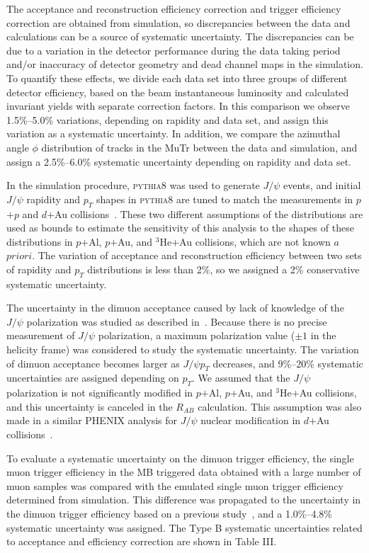 \documentclass[twocolumn,letterpaper,aps,prc,longbibliography,superscriptaddress,nofootinbib,floatfix]{revtex4-1}
\newcommand{\pt}{\mbox{$p_T$}\xspace}
\newcommand{\rab}{\mbox{$R_{AB}$}\xspace}
\newcommand{\pp}{\mbox{$p$$+$$p$}\xspace}
\newcommand{\dau}{\mbox{$d$$+$Au}\xspace}
\newcommand{\pau}{\mbox{$p$$+$Au}\xspace}
\newcommand{\pal}{\mbox{$p$$+$Al}\xspace}
\newcommand{\heau}{\mbox{$^{3}$He$+$Au}\xspace}
\newcommand{\jpsi}{\mbox{$J/\psi$}\xspace}
\newcommand{\pythia}{\mbox{\textsc{pythia8}}\xspace}
\begin{document}
The acceptance and reconstruction efficiency correction and trigger 
efficiency correction are obtained from simulation, so discrepancies 
between the data and calculations can be a source of systematic uncertainty. The 
discrepancies can be due to a variation in the detector performance 
during the data taking period and/or inaccuracy of detector geometry and 
dead channel maps in the simulation. To quantify these effects, 
we divide each data set into three groups of different detector 
efficiency, based on the beam instantaneous luminosity and calculated 
invariant yields with separate correction factors. In this comparison we 
observe 1.5\%--5.0\% variations, depending on rapidity and data set, and 
assign this variation as a systematic uncertainty. In addition, we 
compare the azimuthal angle $\phi$ distribution of tracks in the MuTr 
between the data and simulation, and assign a 2.5\%--6.0\% systematic 
uncertainty depending on rapidity and data set.

In the simulation procedure, \pythia was used to generate \jpsi events, 
and initial \jpsi rapidity and \pt shapes in \pythia are tuned to match 
the measurements in \pp and \dau 
collisions~\cite{Adare:2011vq,Adare:2012qf,Adare:2010fn}.  These two 
different assumptions of the distributions are used as bounds to 
estimate the sensitivity of this analysis to the shapes of these 
distributions in \pal, \pau, and \heau collisions, which are not known 
$a$ $priori$. The variation of acceptance and reconstruction efficiency 
between two sets of rapidity and \pt distributions is less than 2\%, so 
we assigned a 2\% conservative systematic uncertainty.

The uncertainty in the dimuon acceptance caused by lack of knowledge of 
the \jpsi polarization was studied as described in~\cite{Adare:2011vq}. 
Because there is no precise measurement of \jpsi polarization, a maximum 
polarization value ($\pm1$ in the helicity frame) was considered to 
study the systematic uncertainty. The variation of dimuon acceptance 
becomes larger as \jpsi \pt decreases, and 9\%--20\% systematic 
uncertainties are assigned depending on \pt. We assumed that the \jpsi 
polarization is not significantly modified in \pal, \pau, and \heau 
collisions, and this uncertainty is canceled in the \rab calculation.  
This assumption was also made in a similar PHENIX analysis for \jpsi 
nuclear modification in $d$$+$Au collisions~\cite{Adare:2012qf}.

To evaluate a systematic uncertainty on the dimuon trigger 
efficiency, the single muon trigger efficiency in the MB triggered data 
obtained with a large number of muon samples was compared with the 
emulated single muon trigger efficiency determined from simulation. This 
difference was propagated to the uncertainty in the dimuon trigger 
efficiency based on a previous study~\cite{Aidala:2018ajl}, and a 
1.0\%--4.8\% systematic uncertainty was assigned.  The Type B systematic 
uncertainties related to acceptance and efficiency correction are shown 
in Table III.
\end{document}
